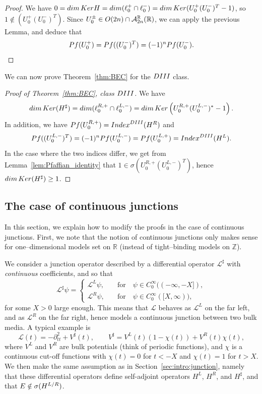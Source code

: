 \documentclass[11pt]{amsart}
\numberwithin{equation}{section} %
\newcommand\1{{\mathds 1}}
\def\R{{\mathbb R}}
\def\Z{{\mathbb Z}}
\def\cA{{\mathcal A}}
\def\cL{{\mathcal L}}
\def\rDIII{{\rm DIII}}
\def\O{{\rm O}}
\def\Index{{\rm Index}}
\def\Ker{{\rm Ker }}
\def\dim{{\rm dim }}
\def\Pf{{\rm Pf}}
\begin{document}
\begin{proof}
    We have $0 = \dim \, \Ker H = \dim (\ell_0^+ \cap \ell_0^- ) = \dim \, \Ker(U_0^+ (U_0^-)^T - 1)$, so $1 \notin (U_0^+ (U_0^-)^T)$. Since $U_0^{\pm} \in \O(2n) \cap \cA_{2n}^\R(\R)$, we can apply the previous Lemma, and deduce that
    \[
        \Pf(U_0^+) =  \Pf((U_0^-)^T) = (-1)^n \Pf(U_0^-).
    \]
\end{proof}

We can now prove Theorem~\ref{thm:BEC} for the $\rDIII$ class.

\begin{proof}[Proof of Theorem~\ref{thm:BEC}, class $\rDIII$]
    We have 
    \[
        \dim \, \Ker (H^\sharp) = \dim (\ell_0^{R, +} \cap \ell_0^{L, -}) = \dim \, \Ker \left( U_0^{R, +} (U_0^{L, -})^* - 1 \right).
    \]
    In addition, we have $\Pf(U_0^{R, +}) = \Index^\rDIII(H^R)$ and 
    \[
        \Pf((U_0^{L, -})^T) = (-1)^n \Pf(U_0^{L, -}) = \Pf(U_0^{L, +}) = \Index^\rDIII(H^L).
    \]
    In the case where the two indices differ, we get from Lemma~\ref{lem:Pfaffian_identity} that $1 \in \sigma(U_0^{R, +}  (U_0^{L, -})^T)$, hence $\dim \, \Ker (H^\sharp) \ge 1$.
\end{proof}


\subsection{The case of continuous junctions}
\label{ssec:smooth_junctions}

In this section, we explain how to modify the proofs in the case of continuous junctions. First, we note that the notion of continuous junctions only makes sense for one--dimensional models set on $\R$ (instead of tight--binding models on $\Z$).

\medskip

We consider a junction operator described by a differential operator $\cL^\sharp$ with {\em continuous} coefficients, and so that
\[
    \cL^\sharp \psi = \begin{cases}
         \cL^L \psi, & \quad \text{for} \quad \psi \in C^\infty_0((-\infty, -X]), \\
        \cL^R \psi, & \quad \text{for} \quad  \psi \in C^\infty_0([X, \infty)),
    \end{cases}
\]
for some $X > 0$ large enough. This means that $\cL$ behaves as $\cL^L$ on the far left, and as $\cL^R$ on the far right, hence models a continuous junction between two bulk media. A typical example is
\begin{equation} \label{eq:ex:Schrodinger_junction}
    \cL(t) = - \partial_{tt}^2 + V^\sharp(t), \qquad V^\sharp = V^L(t) (1 - \chi(t)) + V^R(t) \chi(t),
\end{equation}
where $V^L$ and $V^R$ are bulk potentials (think of periodic functions), and $\chi$ is a continuous cut-off functions with $\chi(t) = 0$ for $t < -X$ and $\chi(t) = 1$ for $t > X$. We then make the same assumption as in Section~\ref{sec:intro:junction}, namely that these differential operators define self-adjoint operators $H^L$, $H^R$, and $H^\sharp$, and that $E \notin \sigma(H^{\rm L/R})$.
\end{document}
